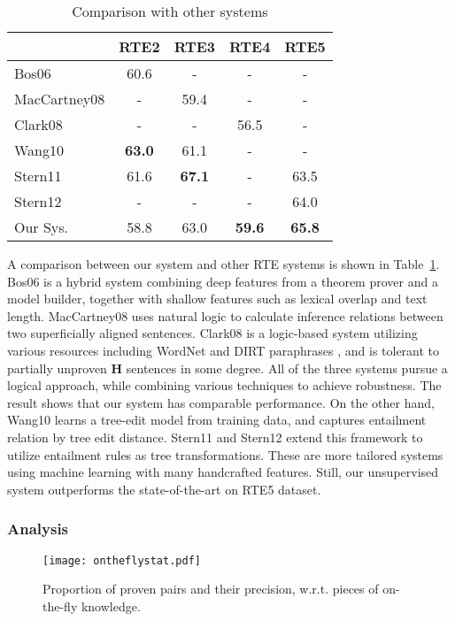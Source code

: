 \documentclass[11pt]{article}
\begin{document}
\begin{table}[t]
\centering
\footnotesize
\setlength{\tabcolsep}{4pt}
\begin{tabular}{| l | c c c c |}
\hline
 & RTE2 & RTE3 & RTE4 & RTE5 \\
\hline
Bos06 & 60.6 & - & - & - \\
MacCartney08 & - & 59.4 & - & - \\
Clark08 & - & - & 56.5 & - \\
Wang10 & \textbf{63.0} & 61.1 & - & - \\
Stern11 & 61.6 & \textbf{67.1} & - & 63.5 \\
Stern12 & - & - & - & 64.0 \\
Our Sys. & 58.8 & 63.0 & \textbf{59.6} & \textbf{65.8} \\
\hline
\end{tabular}
\caption{Comparison with other systems}
\label{tab:rtecompare}
\end{table}

A comparison between our system and other RTE systems is shown in Table~\ref{tab:rtecompare}. 
Bos06 \cite{bos06} is a hybrid system combining deep features from a theorem prover and a model 
builder, together with shallow features such as lexical overlap and text length. MacCartney08 
\cite{maccartney08} uses natural logic to calculate inference relations between two superficially 
aligned sentences. 
Clark08 \cite{clark08} is a logic-based system utilizing various resources including WordNet and 
DIRT paraphrases \cite{lin01}, and is tolerant to partially unproven {\bf H} sentences in some degree. 
All of the three systems pursue a logical approach, while combining various techniques to achieve robustness. 
The result shows that our system has comparable performance. On the other hand, Wang10 \cite{wang10} 
learns a tree-edit model from training data, and captures entailment relation by tree edit distance. 
Stern11 \cite{stern11} and Stern12 \cite{stern12} extend this framework to utilize entailment 
rules as tree transformations. These are more tailored systems using machine learning with many 
handcrafted features. Still, our unsupervised system outperforms the state-of-the-art on RTE5 dataset. 

\subsubsection{Analysis}

\begin{figure}[t]
\centering
\texttt{[image: ontheflystat.pdf]}
\caption{Proportion of proven pairs and their precision, w.r.t. pieces of on-the-fly 
knowledge.}
\label{fig:ontheflystat}
\end{figure}
\end{document}
